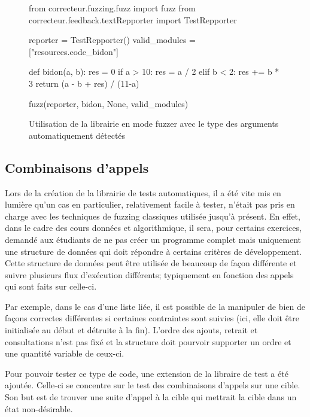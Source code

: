 \documentclass[a4paper]{report}
\begin{document}
\begin{figure}[ht]
\begin{python}
from correcteur.fuzzing.fuzz import fuzz
from correcteur.feedback.textRepporter import TestRepporter


reporter = TestRepporter()
valid_modules = ["resources.code_bidon"]

def bidon(a, b):
    res = 0
    if a > 10:
        res = a / 2
    elif b < 2:
        res += b * 3
    return (a - b + res) / (11-a)


fuzz(reporter,
	bidon,
	None,
	valid_modules)
\end{python}
	\caption{Utilisation de la librairie en mode fuzzer avec le type des arguments automatiquement détectés}
	
	\label{fig:fuzzer_no_args}
\end{figure}


\subsection{Combinaisons d'appels}

Lors de la création de la librairie de tests automatiques, il a été vite mis en lumière qu'un cas en particulier, relativement facile à tester, n'était pas pris en charge avec les techniques de fuzzing classiques utilisée jusqu’à présent.
En effet, dans le cadre des cours données et algorithmique, il sera, pour certains exercices, demandé aux étudiants de ne pas créer un programme complet mais uniquement une structure de données qui doit répondre à certains critères de développement.
Cette structure de données peut être utilisée de beaucoup de façon différente et suivre plusieurs flux d'exécution différents; typiquement en fonction des appels qui sont faits sur celle-ci.

Par exemple, dans le cas d'une liste liée, il est possible de la manipuler de bien de façons correctes différentes si certaines contraintes sont suivies (ici, elle doit être initialisée au début et détruite à la fin).
L'ordre des ajouts, retrait et consultations n'est pas fixé et la structure doit pourvoir supporter un ordre et une quantité variable de ceux-ci.

Pour pouvoir tester ce type de code, une extension de la libraire de test a été ajoutée.
Celle-ci se concentre sur le test des combinaisons d'appels sur une cible.
Son but est de trouver une suite d'appel à la cible qui mettrait la cible dans un état non-désirable.
\end{document}
